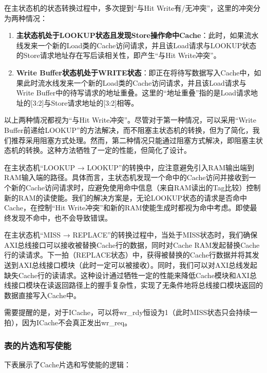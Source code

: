 在主状态机的状态转换过程中，多次提到``与Hit Write有/无冲突''，这里的冲突分为两种情况：

\begin{enumerate}
\def\labelenumi{\arabic{enumi}.}
\item
  \textbf{主状态机处于LOOKUP状态且发现Store操作命中Cache}：此时，如果流水线发来一个新的Load类的Cache访问请求，并且该Load请求与LOOKUP状态的Store请求地址存在写后读相关性，即产生``与Hit Write冲突''。
\item
  \textbf{Write Buffer状态机处于WRITE状态}：即正在将待写数据写入Cache中，如果此时流水线发来一个新的Load类的Cache访问请求，并且该Load请求与Write Buffer中的待写请求的地址重叠。这里的``地址重叠''指的是Load请求地址的{[}3:2{]}与Store请求地址的{[}3:2{]}相等。
\end{enumerate}

以上两种情况都视为``与Hit Write冲突''。尽管对于第一种情况，可以采用``Write Buffer前递给LOOKUP''的方法解决，而不阻塞主状态机的转换，但为了简化，我们推荐采用阻塞方式处理。然而，第二种情况只能通过阻塞方式解决，即阻塞主状态机的转换。这种方法牺牲了一定的性能，但简化了设计。

在主状态机``LOOKUP → LOOKUP''的转换中，应注意避免引入RAM输出端到RAM输入端的路径。具体而言，主状态机发现一个命中的Cache访问并接收到一个新的Cache访问请求时，应避免使用命中信息（来自RAM读出的Tag比较）控制新的RAM的读使能。我们的解决方案是，无论LOOKUP状态的请求是否命中Cache，在控制``Hit Write冲突''和新的RAM使能生成时都视为命中考虑。即使最终发现不命中，也不会导致错误。

在主状态机``MISS → REPLACE''的转换过程中，当处于MISS状态时，我们确保AXI总线接口可以接收被替换Cache行的数据，同时对Cache RAM发起替换Cache行的读请求。下一拍（REPLACE状态）中，获得被替换的Cache行数据并将其发送到AXI总线接口模块（此时一定可以被接收）。同时，我们可以对AXI总线发起缺失Cache行的读请求。这种设计通过牺牲一定的性能来降低Cache模块和AXI总线接口模块在读返回路径上的握手复杂性，实现了无条件地将总线接口模块返回的数据直接写入Cache中。

需要提醒的是，对于ICache，可以将wr\_rdy恒设为1（此时MISS状态只会持续一拍），因为ICache不会真正发出wr\_req。

\subsubsection{表的片选和写使能}\label{sec:09-cache-017}

下表展示了Cache片选和写使能的逻辑：

